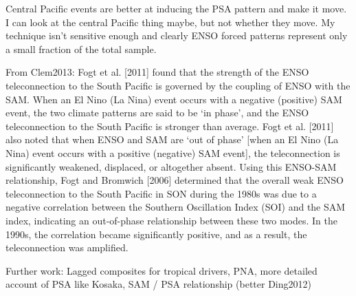 Central Pacific events are better at inducing the PSA pattern and make it move. I can look at the central Pacific thing maybe, but not whether they move. My technique isn't sensitive enough and clearly ENSO forced patterns represent only a small fraction of the total sample.

From Clem2013: Fogt et al. [2011] found that the strength of the ENSO teleconnection to the South Pacific is governed by the coupling of ENSO with the SAM. When an El Nino (La Nina) event occurs with a negative (positive) SAM event, the two climate patterns are said to be ‘in phase’, and the ENSO teleconnection to the South Pacific is stronger than average. Fogt et al. [2011] also noted that when ENSO and SAM are ‘out of phase’ [when an El Nino (La Nina) event occurs with a positive (negative) SAM event], the teleconnection is significantly weakened, displaced, or altogether absent. Using this ENSO-SAM relationship, Fogt and Bromwich [2006] determined that the overall weak ENSO teleconnection to the South Pacific in SON during the 1980s was due to a negative correlation between the Southern Oscillation Index (SOI) and the SAM index, indicating an out-of-phase relationship between these two modes. In the 1990s, the correlation became significantly positive, and as a result, the teleconnection was amplified.


Further work: Lagged composites for tropical drivers, PNA, more detailed account of PSA like Kosaka, SAM / PSA relationship (better Ding2012)